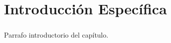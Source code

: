 \chapter{Introducción Específica}
\label{Chapter2}

\paragraph{} Parrafo introductorio del capítulo.
